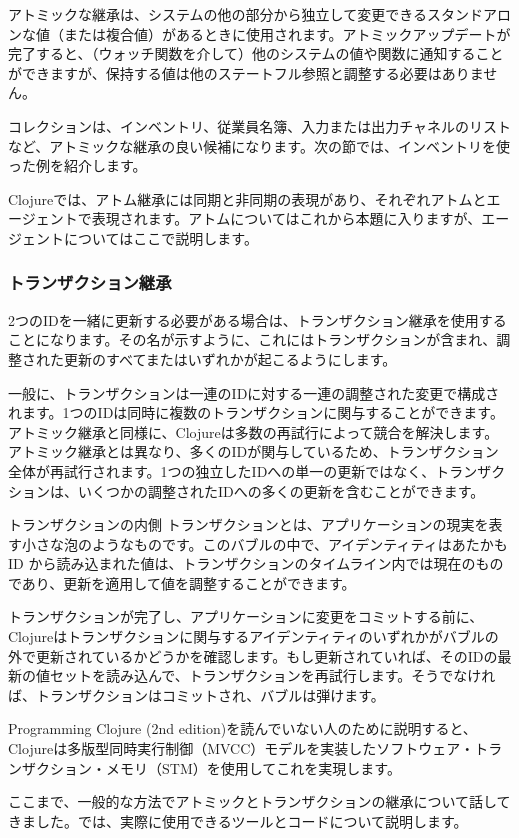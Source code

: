 アトミックな継承は、システムの他の部分から独立して変更できるスタンドアロンな値（または複合値）があるときに使用されます。アトミックアップデートが完了すると、（ウォッチ関数を介して）他のシステムの値や関数に通知することができますが、保持する値は他のステートフル参照と調整する必要はありません。

コレクションは、インベントリ、従業員名簿、入力または出力チャネルのリストなど、アトミックな継承の良い候補になります。次の節では、インベントリを使った例を紹介します。

Clojureでは、アトム継承には同期と非同期の表現があり、それぞれアトムとエージェントで表現されます。アトムについてはこれから本題に入りますが、エージェントについてはここで説明します。

\subsubsection{トランザクション継承}

2つのIDを一緒に更新する必要がある場合は、トランザクション継承を使用することになります。その名が示すように、これにはトランザクションが含まれ、調整された更新のすべてまたはいずれかが起こるようにします。

一般に、トランザクションは一連のIDに対する一連の調整された変更で構成されます。1つのIDは同時に複数のトランザクションに関与することができます。アトミック継承と同様に、Clojureは多数の再試行によって競合を解決します。アトミック継承とは異なり、多くのIDが関与しているため、トランザクション全体が再試行されます。1つの独立したIDへの単一の更新ではなく、トランザクションは、いくつかの調整されたIDへの多くの更新を含むことができます。

\begin{itembox}[l]{トランザクションの内側}
トランザクションとは、アプリケーションの現実を表す小さな泡のようなものです。このバブルの中で、アイデンティティはあたかも ID から読み込まれた値は、トランザクションのタイムライン内では現在のものであり、更新を適用して値を調整することができます。

トランザクションが完了し、アプリケーションに変更をコミットする前に、Clojureはトランザクションに関与するアイデンティティのいずれかがバブルの外で更新されているかどうかを確認します。もし更新されていれば、そのIDの最新の値セットを読み込んで、トランザクションを再試行します。そうでなければ、トランザクションはコミットされ、バブルは弾けます。
\end{itembox}

Programming Clojure (2nd edition)を読んでいない人のために説明すると、Clojureは多版型同時実行制御（MVCC）モデルを実装したソフトウェア・トランザクション・メモリ（STM）を使用してこれを実現します。

ここまで、一般的な方法でアトミックとトランザクションの継承について話してきました。では、実際に使用できるツールとコードについて説明します。

